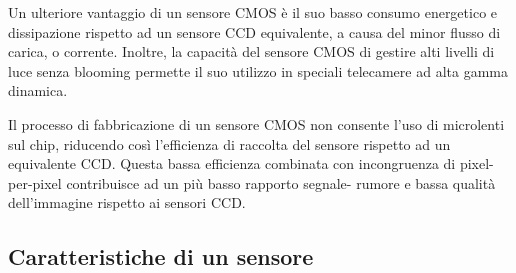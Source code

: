 Un ulteriore vantaggio di un sensore CMOS è il suo basso consumo energetico e
dissipazione rispetto ad un sensore CCD equivalente, a causa del minor flusso
di carica, o corrente. Inoltre, la capacità del sensore CMOS di gestire alti
livelli di luce senza blooming permette il suo utilizzo in speciali telecamere
ad alta gamma dinamica.

Il processo di fabbricazione di un sensore CMOS non consente l'uso di
microlenti sul chip, riducendo così l'efficienza di raccolta  del sensore
rispetto ad un equivalente CCD. Questa bassa efficienza combinata con
incongruenza di pixel-per-pixel contribuisce ad un più basso rapporto segnale-
rumore e bassa qualità dell'immagine rispetto ai sensori CCD.

\subsection{Caratteristiche di un sensore}

